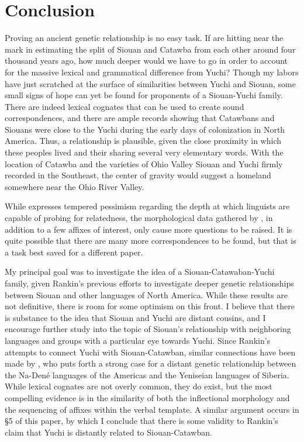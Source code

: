 \documentclass[output=paper]{LSP/langsci}
\begin{document}
\section{Conclusion}\label{sec:kasak:6}

Proving an ancient genetic relationship is no easy task. If \citet{ParksRankin2001} are hitting near the mark in estimating the split of Siouan and Catawba from each other around four thousand years ago, how much deeper would we have to go in order to account for the massive lexical and grammatical difference from Yuchi? Though my labors have just scratched at the surface of similarities between Yuchi and Siouan, some small signs of hope can yet be found for proponents of a Siouan-Yuchi family. There are indeed lexical cognates that can be used to create sound correspondences, and there are ample records showing that Catawbans and Siouans were close to the Yuchi during the early days of colonization in North America. Thus, a relationship is plausible, given the close proximity in which these peoples lived and their sharing several very elementary words. With the location of Catawba and the varieties of Ohio Valley Siouan and Yuchi firmly recorded in the Southeast, the center of gravity would suggest a homeland somewhere near the Ohio River Valley.

While \citet{Rankin1996} expresses tempered pessimism regarding the depth at which linguists are capable of probing for relatedness, the morphological data gathered by \citet{Rankin1998scy}, in addition to a few affixes of interest, only cause more questions to be raised. It is quite possible that there are many more correspondences to be found, but that is a task best saved for a different paper.

My principal goal was to investigate the idea of a Siouan-Catawaban-Yuchi family, given Rankin's \citeyear{Rankin1996,Rankin1998scy} previous efforts to investigate deeper genetic relationships between Siouan and other languages of North America. While these results are not definitive, there is room for some optimism on this front. I believe that there is substance to the idea that Siouan and Yuchi are distant cousins, and I encourage further study into the topic of Siouan's relationship with neighboring languages and groups with a particular eye towards Yuchi. Since Rankin's attempts to connect Yuchi with Siouan-Catawban, similar connections have been made by \citet{Vajda2010}, who puts forth a strong case for a distant genetic relationship between the Na-Den\'e languages of the Americas and the Yeniseian languages of Siberia. While lexical cognates are not overly common, they do exist, but the most compelling evidence is in the similarity of both the inflectional morphology and the sequencing of affixes within the verbal template. A similar argument occurs in \S5 of this paper, by which I conclude that there is some validity to Rankin's claim that Yuchi is distantly related to Siouan-Catawban.
\end{document}
